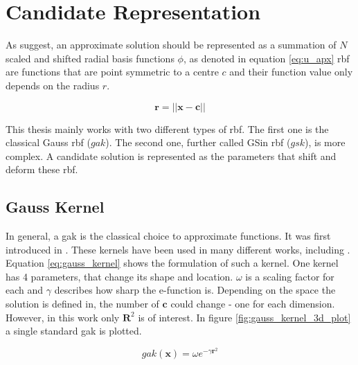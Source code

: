 \documentclass[./\jobname.tex]{subfiles}
\begin{document}
\section{Candidate Representation}
\label{chap:candidate_rep}

As \cite{chaquet_using_2019} suggest, an approximate solution should be represented as a summation of $N$ scaled and shifted radial basis functions $\phi$, as denoted in equation \ref{eq:u_apx}  \gls{rbf} are functions that are point symmetric to a centre $c$ and their function value only depends on the radius $r$. 

\begin{equation}
\label{eq: radius}
\mathbf{r} = \left|\left|\mathbf{x} - \mathbf{c} \right|\right|
\end{equation}

This thesis mainly works with two different types of \gls{rbf}. The first one is the classical Gauss \gls{rbf} ($gak$). The second one, further called GSin \gls{rbf} ($gsk$), is more complex. A candidate solution is represented as the parameters that shift and deform these \gls{rbf}. 

\subsection{Gauss Kernel}
\label{chap:gauss_kernel}

In general, a \gls{gak} is the classical choice to approximate functions. It was first introduced in \cite{broomhead_multivariable_1988}. These kernels have been used in many different works, including \cite{chaquet_using_2019}.  Equation \ref{eq:gauss_kernel} shows the formulation of such a kernel. One kernel has 4 parameters, that change its shape and location. $\omega$ is a scaling factor for each and $\gamma$ describes how sharp the e-function is. Depending on the space the solution is defined in, the number of $\mathbf{c}$ could change - one for each dimension. However, in this work only $\mathbf{R}^2$ is of interest. In figure \ref{fig:gauss_kernel_3d_plot} a single standard \gls{gak} is plotted. 

\begin{equation}
\label{eq:gauss_kernel}
gak(\mathbf{x}) = \omega e^{-\gamma \mathbf{r}^2}
\end{equation}
\end{document}
